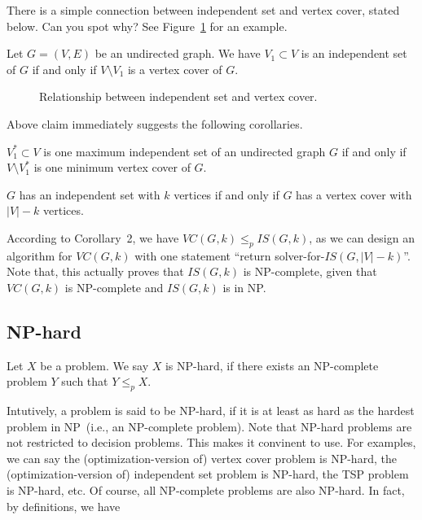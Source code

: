 There is a simple connection between independent set and vertex cover, stated below. Can you spot why?
See Figure~\ref{fig:is} for an example.

\begin{claim}
Let $G = (V, E)$ be an undirected graph. We have $V_1\subset V$ is an independent set of $G$ if and only if $V\setminus V_1$ is a vertex cover of $G$.
\end{claim}

\begin{figure}[!h]
\centering{}
\caption{Relationship between independent set and vertex cover.}
\label{fig:is}
\end{figure}

Above claim immediately suggests the following corollaries.
\begin{corollary}
$V_1^*\subset V$ is one maximum independent set of an undirected graph $G$ if and only if $V\setminus V_1^*$ is one minimum vertex cover of $G$.
\end{corollary}
\begin{corollary}
$G$ has an independent set with $k$ vertices if and only if $G$ has a vertex cover with $|V|-k$ vertices.
\end{corollary}

According to Corollary~2, we have $VC(G, k) \le_p IS(G, k)$, as we can design an algorithm for $VC(G,k)$ with one statement ``return solver-for-$IS(G,|V|-k)$''.
Note that, this actually proves that $IS(G,k)$ is NP-complete, given that $VC(G,k)$ is NP-complete and $IS(G,k)$ is in NP.

\subsection*{NP-hard}

\begin{definition}[NP-hard]
Let $X$ be a problem. We say $X$ is NP-hard, if there exists an NP-complete problem $Y$ such that $Y\le_p X$.
\end{definition}

Intutively, a problem is said to be NP-hard, if it is at least as hard as the hardest problem in NP~(i.e., an NP-complete problem).
Note that NP-hard problems are not restricted to decision problems. This makes it convinent to use. For examples, 
we can say the (optimization-version of) vertex cover problem is NP-hard,
the (optimization-version of) independent set problem is NP-hard,
the TSP problem is NP-hard, etc.
Of course, all NP-complete problems are also NP-hard. In fact, by definitions, we have

